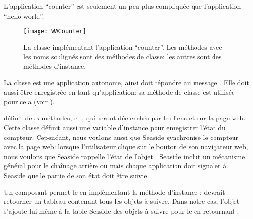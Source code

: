 \documentclass[a4paper,10pt,twoside]{book}
\begin{document}
L'application ``counter'' est seulement un peu plus compliquée que
l'application ``hello world''.

\begin{figure}[ht]
\begin{center}
\texttt{[image: WACounter]}
\caption{La classe  implémentant l'application
  ``counter''. Les méthodes avec les noms soulignés sont des méthodes
  de classe; les autres sont des méthodes d'instance.}
\end{center}
\end{figure}

La classe   est une application autonome,
ainsi  doit répondre  au message 
 .
Elle doit aussi être enregistrée en tant qu'application; sa méthode de
classe  est utilisée pour cela (voir
).

 définit deux méthodes,  et ,
qui seront déclenchés par les liens \link{++} et \link{{-}{-}} sur la
page web.
Cette classe définit aussi une variable d'instance 
  pour enregistrer l'état du compteur.
Cependant, nous voulons aussi que Seaside synchronise le compteur avec la page web:
lorsque l'utilisateur clique sur le bouton \backbtn{} de son
navigateur web, nous voulons que Seaside rappelle l'état de l'objet
.
Seaside inclut un mécanisme général pour le chaînage arrière ou
\backtracking mais chaque application doit signaler à Seaside quelle
partie de son état doit être suivie.

Un composant permet le \backtracking en implémentant la méthode
d'instance :
 devrait retourner un tableau contenant tous les objets à
suivre. Dans notre cas, l'objet  s'ajoute lui-même à la
table Seaside des objets à suivre pour le \backtracking en retournant
.
\end{document}

